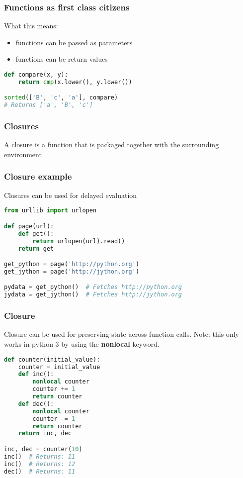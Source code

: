 \documentclass{beamer}
\begin{document}
\begin{frame}[fragile]
\frametitle{Functions as first class citizens}

What this means:
\begin{itemize}
  \item functions can be passed as parameters
  \item functions can be return values
\end{itemize}
\pause
\begin{lstlisting}[language=python]
def compare(x, y):
    return cmp(x.lower(), y.lower())

sorted(['B', 'c', 'a'], compare)
# Returns ['a', 'B', 'c']
\end{lstlisting}

\end{frame}


\begin{frame}[fragile]
\frametitle{Closures}
A closure is a function that is packaged together with the surrounding environment
\end{frame}


\begin{frame}[fragile]
\frametitle{Closure example}
Closures can be used for delayed evaluation
\vspace{5 mm}
\begin{lstlisting}[language=python]
from urllib import urlopen

def page(url):
    def get():
        return urlopen(url).read()
    return get

get_python = page('http://python.org')
get_jython = page('http://jython.org')

pydata = get_python()  # Fetches http://python.org
jydata = get_jython()  # Fetches http://jython.org
\end{lstlisting}
\end{frame}


\begin{frame}[fragile]
\frametitle{Closure}
Closure can be used for preserving state across function calls. Note: this only works in python 3 by using the {\bf nonlocal} keyword.

\vspace{5 mm}
\begin{lstlisting}[language=python]
def counter(initial_value):
    counter = initial_value
    def inc():
        nonlocal counter
        counter += 1
        return counter
    def dec():
        nonlocal counter
        counter -= 1
        return counter
    return inc, dec

inc, dec = counter(10)
inc()  # Returns: 11
inc()  # Returns: 12
dec()  # Returns: 11
\end{lstlisting}
\end{frame}
\end{document}
